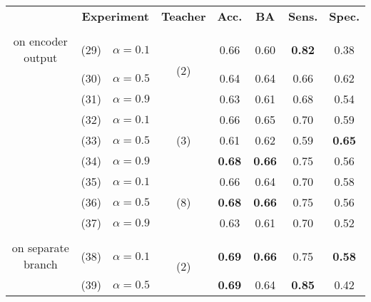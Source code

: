 \begin{table}
    \begin{tabular}{c|ll|c|c|c|c|c|}
        \hhline{~-------}
        & \multicolumn{2}{|c|}{\textbf{Experiment}} & \textbf{Teacher} & \textbf{Acc.} & \textbf{BA} & \textbf{Sens.} & \textbf{Spec.} \\
        \hhline{~=======}
        \multirow{9}{*}{\begin{minipage}{2cm}\centering KD \\ on encoder output\end{minipage}}
        & (29) & $\alpha=0.1$ & \multirow{3}{*}{(2)} &         0.66  &         0.60  & \textbf{0.82} &         0.38  \\
        & (30) & $\alpha=0.5$ &                      &         0.64  &         0.64  &         0.66  &         0.62  \\
        & (31) & $\alpha=0.9$ &                      &         0.63  &         0.61  &         0.68  &         0.54  \\
        \hhline{~-------}
        & (32) & $\alpha=0.1$ & \multirow{3}{*}{(3)} &         0.66  &         0.65  &         0.70  &         0.59  \\
        & (33) & $\alpha=0.5$ &                      &         0.61  &         0.62  &         0.59  & \textbf{0.65} \\
        & (34) & $\alpha=0.9$ &                      & \textbf{0.68} & \textbf{0.66} &         0.75  &         0.56  \\
        \hhline{~-------}
        & (35) & $\alpha=0.1$ & \multirow{3}{*}{(8)} &         0.66  &         0.64  &         0.70  &         0.58  \\
        & (36) & $\alpha=0.5$ &                      & \textbf{0.68} & \textbf{0.66} &         0.75  &         0.56  \\
        & (37) & $\alpha=0.9$ &                      &         0.63  &         0.61  &         0.70  &         0.52  \\
        \hhline{~=======}
        \multirow{6}{*}{\begin{minipage}{2cm}\centering KD \\ on separate branch\end{minipage}}
        & (38) & $\alpha=0.1$ & \multirow{3}{*}{(2)} & \textbf{0.69} & \textbf{0.66} &         0.75  & \textbf{0.58} \\
        & (39) & $\alpha=0.5$ &                      & \textbf{0.69} &         0.64  & \textbf{0.85} &         0.42  \\

\end{tabular}
\end{table}
